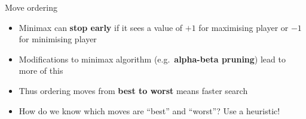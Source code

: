 \begin{frame}{Move ordering}
	\begin{itemize}
		\pause\item Minimax can \textbf{stop early} if it sees a value of $+1$ for maximising player or $-1$
			for minimising player
		\pause\item Modifications to minimax algorithm (e.g.\ \textbf{alpha-beta pruning}) lead to more of this
		\pause\item Thus ordering moves from \textbf{best to worst} means faster search
		\pause\item How do we know which moves are ``best'' and ``worst''? Use a heuristic!
	\end{itemize}
\end{frame}

